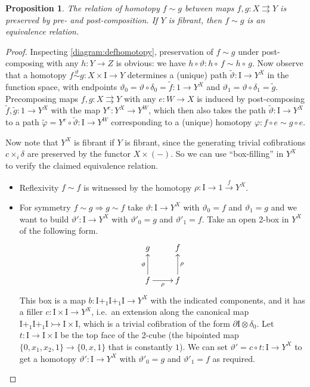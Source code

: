 \documentclass[11pt,reqno]{amsart}
\newcommand{\mono}{\ensuremath{\rightarrowtail}}
\newcommand{\ra}{\ensuremath{\rightarrow}}
\renewcommand{\to}{\ensuremath{\rightarrow}}
\newcommand{\I}{\ensuremath{\mathrm{I}}}
\newcommand{\del}{\ensuremath{\partial}}
\newtheorem{proposition}[theorem]{Proposition}
\theoremstyle{remark}
\theoremstyle{definition}
\begin{document}
\begin{proposition}\label{prop:homotopyintofibequivrel}
The relation of homotopy $f \sim g$ between maps $f, g: X\rightrightarrows Y$ is preserved by pre- and post-composition. If $Y$ is fibrant, then $f \sim g$ is an equivalence relation.
\end{proposition}
%
\begin{proof}
Inspecting \eqref{diagram:defhomotopy}, preservation of $f\sim g$ under post-composing with any $h : Y\to Z$ is obvious: we have $h\circ\vartheta : h\circ\,f \sim h\circ\,g$.  Now observe that a homotopy $f\stackrel{\vartheta}{\sim} g : X\times\I \ra Y$ determines a (unique) path $\tilde{\vartheta} : \I\ra Y^X$ in the function space, with endpoints $\vartheta_0 = \vartheta\circ\delta_0 = \tilde{f}: 1\ra Y^X$ and $\vartheta_1 = \vartheta\circ\delta_1 = \tilde{g}$.  
Precomposing maps $f, g: X\rightrightarrows Y$ with any $e : W \to X$ is induced by post-composing  $\tilde{f}, \tilde{g}: 1\ra Y^X$ with the map $Y^e : Y^X \to Y^W$, which then also takes the path $\tilde{\vartheta} : \I \ra Y^X$ to a path $\tilde{\varphi} = Y^e \circ \tilde{\vartheta} : \I \ra Y^W$ corresponding to a  (unique) homotopy $\varphi : f\circ e \sim g\circ e$.

Now note that $Y^X$ is fibrant if $Y$ is fibrant, since the generating trivial cofibrations $c\times_i \delta$ are preserved by the functor $X\times(-)$.  So we can use ``box-filling'' in $Y^X$ to verify the claimed equivalence relation.    
\begin{itemize}
\item Reflexivity $f\sim f$ is witnessed by the homotopy $\rho:\I \ra 1 \stackrel{f}{\ra} Y^X$.  
\item For symmetry $f\sim g\Rightarrow g\sim f$ take $\vartheta : \I\ra Y^X$ with $\vartheta_0 = f$ and $\vartheta_1 = g$ and we want to build $\vartheta' : \I\ra Y^X$ with $\vartheta'_0 = g$ and $\vartheta'_1 = f$. Take an open 2-box in $Y^X$ of the following form.
\begin{equation*}%
\xymatrix{
g  & f  \\
f \ar[u]^{\vartheta} \ar[r]_\rho & f \ar[u]_\rho
}
\end{equation*}
This box is a map $b : \I+_1 \I +_1 \I \ra Y^X$ with the indicated components, and it has a filler $c : \I\times \I \ra Y^X$, i.e.\ an extension along the canonical map $\I+_1 \I +_1 \I \mono \I\times\I$, which is a trivial cofibration of the form $\del{\I} \otimes \delta_0$.  Let $t : \I\ra \I\times\I$ be the top face of the 2-cube (the bipointed map $\{0, x_1, x_2, 1\}\to \{0, x, 1\}$ that is constantly $1$).  We can set $\vartheta' = c\circ t : \I \ra Y^X$ to get a homotopy $\vartheta' : \I\ra Y^X$ with $\vartheta'_0 = g$ and $\vartheta'_1 = f$ as required.


\end{itemize}
\end{proof}
\end{document}
